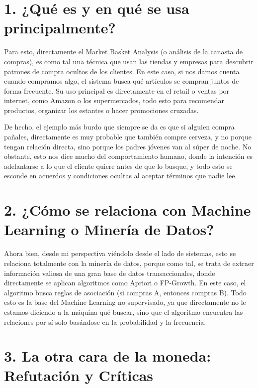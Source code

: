 \documentclass[letterpaper,11pt]{article}
\begin{document}


\newpage

\setcounter{page}{1}
\singlespacing

\section*{1. ¿Qué es y en qué se usa principalmente?}

Para esto, directamente el Market Basket Analysis (o análisis de la canasta de compras), es como tal una técnica que usan las tiendas y empresas para descubrir patrones de compra ocultos de los clientes. En este caso, si nos damos cuenta cuando compramos algo, el sistema busca qué artículos se compran juntos de forma frecuente. Su uso principal es directamente en el retail o ventas por internet, como Amazon o los supermercados, todo esto para recomendar productos, organizar los estantes o hacer promociones cruzadas.

De hecho, el ejemplo más burdo que siempre se da es que si alguien compra pañales, directamente es muy probable que también compre cerveza, y no porque tengan relación directa, sino porque los padres jóvenes van al súper de noche. No obstante, esto nos dice mucho del comportamiento humano, donde la intención es adelantarse a lo que el cliente quiere antes de que lo busque, y todo esto se esconde en acuerdos y condiciones ocultas al aceptar términos que nadie lee.

\section*{2. ¿Cómo se relaciona con Machine Learning o Minería de Datos?}

Ahora bien, desde mi perspectiva viéndolo desde el lado de sistemas, esto se relaciona totalmente con la minería de datos, porque como tal, se trata de extraer información valiosa de una gran base de datos transaccionales, donde directamente se aplican algoritmos como Apriori o FP-Growth. En este caso, el algoritmo busca reglas de asociación (si compras A, entonces compras B). Todo esto es la base del Machine Learning no supervisado, ya que directamente no le estamos diciendo a la máquina qué buscar, sino que el algoritmo encuentra las relaciones por sí solo basándose en la probabilidad y la frecuencia.

\section*{3. La otra cara de la moneda: Refutación y Críticas}
\end{document}
